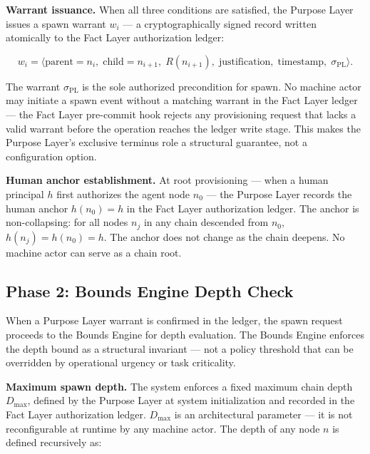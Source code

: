 \medskip
\noindent\textbf{Warrant issuance.} When all three conditions are satisfied, the Purpose Layer issues a spawn warrant $w_i$ --- a cryptographically signed record written atomically to the Fact Layer authorization ledger:

\begin{equation}
w_i = \bigl\langle
\text{parent}=n_i,\;
\text{child}=n_{i+1},\;
R(n_{i+1}),\;
\text{justification},\;
\text{timestamp},\;
\sigma_{\text{PL}}
\bigr\rangle .
\label{eq:spawn-warrant}
\end{equation}

The warrant $\sigma_{\text{PL}}$ is the sole authorized precondition for spawn. No machine actor may initiate a spawn event without a matching warrant in the Fact Layer ledger --- the Fact Layer pre-commit hook rejects any provisioning request that lacks a valid warrant before the operation reaches the ledger write stage. This makes the Purpose Layer's exclusive terminus role a structural guarantee, not a configuration option.

\medskip
\noindent\textbf{Human anchor establishment.} At root provisioning --- when a human principal $h$ first authorizes the agent node $n_0$ --- the Purpose Layer records the human anchor $h(n_0) = h$ in the Fact Layer authorization ledger. The anchor is non-collapsing: for all nodes $n_j$ in any chain descended from $n_0$, $h(n_j) = h(n_0) = h$. The anchor does not change as the chain deepens. No machine actor can serve as a chain root.

\subsection{Phase 2: Bounds Engine Depth Check}
\label{sec:rs-bounds-depth}

When a Purpose Layer warrant is confirmed in the ledger, the spawn request proceeds to the Bounds Engine for depth evaluation. The Bounds Engine enforces the depth bound as a structural invariant --- not a policy threshold that can be overridden by operational urgency or task criticality.

\medskip
\noindent\textbf{Maximum spawn depth.} The system enforces a fixed maximum chain depth $D_{\max}$, defined by the Purpose Layer at system initialization and recorded in the Fact Layer authorization ledger. $D_{\max}$ is an architectural parameter --- it is not reconfigurable at runtime by any machine actor. The depth of any node $n$ is defined recursively as:

